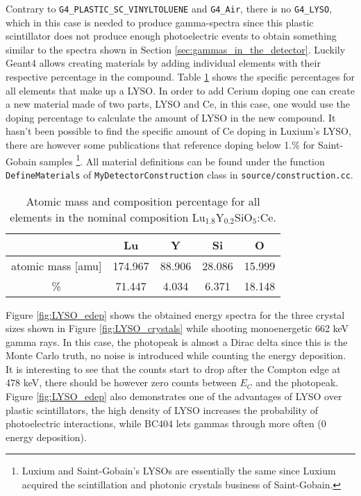 Contrary to \texttt{G4\_PLASTIC\_SC\_VINYLTOLUENE} and \texttt{G4\_Air}, there is no \texttt{G4\_LYSO}, which in this case is needed to produce gamma-spectra since this plastic scintillator does not produce enough photoelectric events to obtain something similar to the spectra shown in Section \ref{sec:gammas_in_the_detector}. Luckily Geant4 allows creating materials by adding individual elements with their respective percentage in the compound. Table \ref{tab:LYSO_composition} shows the specific percentages for all elements that make up a LYSO. In order to add Cerium doping one can create a new material made of two parts, LYSO and Ce, in this case, one would use the doping percentage to calculate the amount of LYSO in the new compound. It hasn't been possible to find the specific amount of Ce doping in Luxium's LYSO, there are however some publications that reference doping below 1.\% for Saint-Gobain samples \cite{Ce_doping,Ce_dopping_2}\footnote{Luxium and Saint-Gobain's LYSOs are essentially the same since Luxium acquired the scintillation and photonic crystals business of Saint-Gobain.}. All material definitions can be found under the function \texttt{DefineMaterials} of \texttt{MyDetectorConstruction} class in \texttt{source/construction.cc}.

\begin{table}[H]
  \caption{Atomic mass and composition percentage for all elements in the nominal composition Lu$_{1.8}$Y$_{0.2}$SiO$_5$:Ce.}
  \centering
  \begin{tabular}{ c c c c c}
    \midrule
     & Lu & Y & Si & O \\
    \midrule
    atomic mass [amu] & 174.967 & 88.906 & 28.086 & 15.999 \\
    \% & 71.447 & 4.034 & 6.371 & 18.148 \\
    \bottomrule
  \end{tabular}
  \label{tab:LYSO_composition}
\end{table}

Figure \ref{fig:LYSO_edep} shows the obtained energy spectra for the three crystal sizes shown in Figure \ref{fig:LYSO_crystals} while shooting monoenergetic 662 \unit{\kilo\eV} gamma rays. In this case, the photopeak is almost a Dirac delta since this is the Monte Carlo truth, no noise is introduced while counting the energy deposition. It is interesting to see that the counts start to drop after the Compton edge at 478 \unit{\kilo\eV}, there should be however zero counts between $E_C$ and the photopeak. Figure \ref{fig:LYSO_edep} also demonstrates one of the advantages of LYSO over plastic scintillators, the high density of LYSO increases the probability of photoelectric interactions, while BC404 lets gammas through more often (0 energy deposition).

